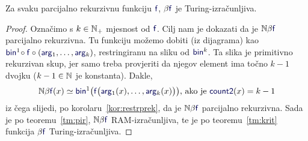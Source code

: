 

\begin{teorem}\label{tm:pibt}
Za svaku parcijalno rekurzivnu funkciju $\f f$, $\beta\f f$ je Turing-izračunljiva.
\end{teorem}
\begin{proof}
Označimo s $k\in{\mathbb N}_+$ mjesnost od $\f f$. Cilj nam je dokazati da je $\N\beta\f f$ parcijalno rekurzivna. Tu funkciju možemo dobiti (iz dijagrama) kao $\f{bin}^1\!\circ\f f\circ(\f{arg}_1,\dotsc,\f{arg}_k)$, restringiranu na sliku od $\f{bin}^k$. Ta slika je primitivno rekurzivan skup, jer samo treba provjeriti da njegov element ima točno $k-1$ dvojku ($k-1\in{\mathbb N}$ je konstanta).
Dakle,
\begin{equation}
\label{eq:defNbetaf}
    \N\beta\f f(x)\simeq\f{bin}^1\bigl(\f f\bigl(\f{arg}_1(x),\dotsc,\f{arg}_k(x)\bigr)\bigr)\text{, ako je }\f{count2}(x)=k-1
\end{equation}
iz čega slijedi, po korolaru~\ref{kor:restrprek}, da je $\N\beta\f f$ parcijalno rekurzivna. Sada je po teoremu~\ref{tm:pir}, $\N\beta\f f$ RAM-izračunljiva, te je po teoremu~\ref{tm:krit} funkcija $\beta\f f$ Turing-iz\-rač\-un\-lji\-va.
\end{proof}



